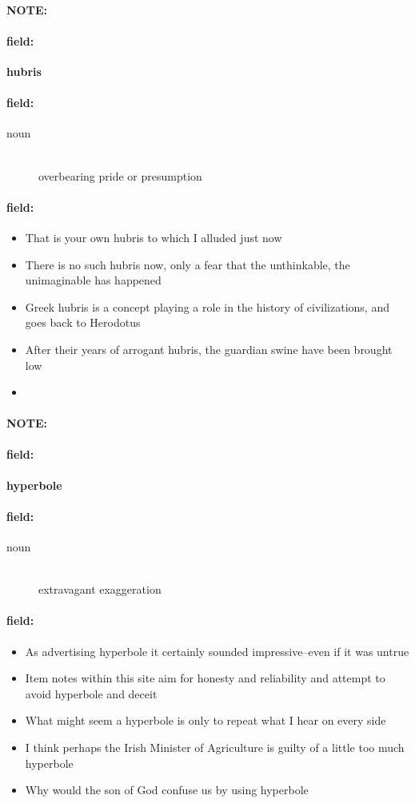 \documentclass[12pt]{article}
\newenvironment{note}{\paragraph{NOTE:}}{}
\newenvironment{field}{\paragraph{field:}}{}
\begin{document}
\begin{note}
\begin{field}
\textbf{\large hubris}
\end{field}


\begin{field}
\begin{description}
\item[noun] \hfill \\ 
overbearing pride or presumption

\end{description}
\end{field}

\begin{field}
\begin{itemize}
\item That is your own hubris to which I alluded just now
\item There is no such hubris now, only a fear that the unthinkable, the unimaginable has happened
\item Greek hubris is a concept playing a role in the history of civilizations, and goes back to Herodotus
\item After their years of arrogant hubris, the guardian swine have been brought low
\item 
\end{itemize}
\end{field}
\end{note}
\begin{note}
\begin{field}
\textbf{\large hyperbole}
\end{field}


\begin{field}
\begin{description}
\item[noun] \hfill \\ 
extravagant exaggeration

\end{description}
\end{field}

\begin{field}
\begin{itemize}
\item As advertising hyperbole it certainly sounded impressive--even if it was untrue
\item Item notes within this site aim for honesty and reliability and attempt to avoid hyperbole and deceit
\item What might seem a hyperbole is only to repeat what I hear on every side
\item I think perhaps the Irish Minister of Agriculture is guilty of a little too much hyperbole
\item Why would the son of God confuse us by using hyperbole
\end{itemize}
\end{field}
\end{note}
\end{document}
